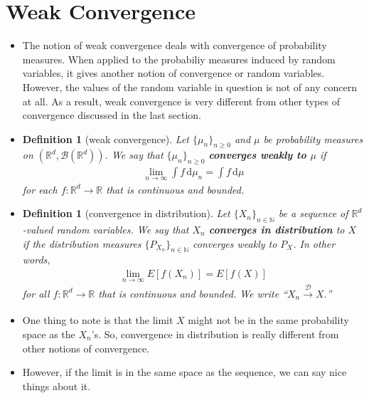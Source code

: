 \documentclass[10pt]{article}
\newtheorem{definition}[lemma]{Definition}
\numberwithin{lemma}{section}
\newcommand{\dee}{\mathrm{d}}
\newcommand{\mcal}[1]{\mathcal{#1}}
\newcommand{\Real}{\mathbb{R}}
\newcommand{\Nat}{\mathbb{N}}
\begin{document}
\section{Weak Convergence}

\begin{itemize}
  \item The notion of weak convergence deals with convergence of probability measures. When applied to the probabiliy measures induced by random variables, it gives another notion of convergence or random variables. However, the values of the random variable in question is not of any concern at all. As a result, weak convergence is very different from other types of convergence discussed in the last section.
  
  \item \begin{definition}[weak convergence]
    Let $\{ \mu_n \}_{n \geq 0}$ and $\mu$ be probability measures on $(\Real^d, \mcal{B}(\Real^d))$. We say that $\{ \mu_n \}_{n \geq 0}$ {\bf converges weakly to $\mu$} if
    \begin{align*}
      \lim_{n \rightarrow \infty} \int f\, \dee\mu_n = \int f\, \dee\mu
    \end{align*}
    for each $f: \Real^d \rightarrow \Real$ that is continuous and bounded.
  \end{definition}

  \item \begin{definition}[convergence in distribution]
    Let $\{ X_n \}_{n \in \Nat}$ be a sequence of $\Real^d$-valued random variables. We say that $X_n$ {\bf converges in distribution} to $X$ if the distribution measures $\{ P_{X_n} \}_{n \in \Nat}$ converges weakly to $P_X$. In other words,
    \begin{align*}
      \lim_{n\rightarrow \infty} E[f(X_n)] = E[f(X)]
    \end{align*}
    for all $f:\Real^d \rightarrow \Real$ that is continuous and bounded. We write ``$X_n \xrightarrow[]{\mcal{D}} X.$''
  \end{definition}

  \item One thing to note is that the limit $X$ might not be in the same probability space as the $X_n$'s. So, convergence in distribution is really different from other notions of convergence.
  
  \item However, if the limit is in the same space as the sequence, we can say nice things about it.
  

\end{itemize}
\end{document}

